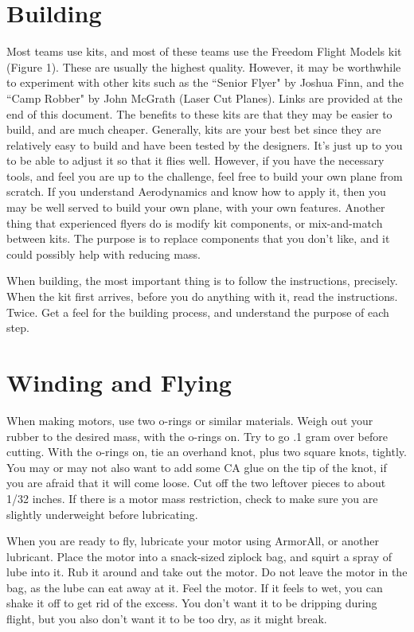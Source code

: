 \documentclass[twocolumn]{article}
\begin{document}
\section{Building}
Most teams use kits, and most of these teams use the Freedom Flight Models kit (Figure 1). These are usually the highest quality. However, it may be worthwhile to experiment with other kits such as the ``Senior Flyer" by Joshua Finn, and the ``Camp Robber" by John McGrath (Laser Cut Planes). Links are provided at the end of this document. The benefits to these kits are that they may be easier to build, and are much cheaper. Generally, kits are your best bet since they are relatively easy to build and have been tested by the designers. It's just up to you to be able to adjust it so that it flies well. However, if you have the necessary tools, and feel you are up to the challenge, feel free to build your own plane from scratch. If you understand Aerodynamics and know how to apply it, then you may be well served to build your own plane, with your own features. Another thing that experienced flyers do is modify kit components, or mix-and-match between kits. The purpose is to replace components that you don't like, and it could possibly help with reducing mass. 

When building, the most important thing is to follow the instructions, precisely. When the kit first arrives, before you do anything with it, read the instructions. Twice. Get a feel for the building process, and understand the purpose of each step. 

\section{Winding and Flying}
When making motors, use two o-rings or similar materials. Weigh out your rubber to the desired mass, with the o-rings on. Try to go .1 gram over before cutting. With the o-rings on, tie an overhand knot, plus two square knots, tightly. You may or may not also want to add some CA glue on the tip of the knot, if you are afraid that it will come loose. Cut off the two leftover pieces to about 1/32 inches. If there is a motor mass restriction, check to make sure you are slightly underweight before lubricating. 

When you are ready to fly, lubricate your motor using ArmorAll, or another lubricant. Place the motor into a snack-sized ziplock bag, and squirt a spray of lube into it. Rub it around and take out the motor. Do not leave the motor in the bag, as the lube can eat away at it. Feel the motor. If it feels to wet, you can shake it off to get rid of the excess. You don't want it to be dripping during flight, but you also don't want it to be too dry, as it might break. 
\end{document}
